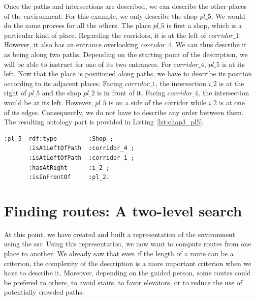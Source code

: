 Once the paths and intersections are described, we can describe the other places of the environment. For this example, we only describe the shop $pl\_5$. We would do the same process for all the others. The place $pl\_5$ is first a shop,  which is a particular kind of place. Regarding the corridors, it is at the left of $corridor\_1$. However, it also has an entrance overlooking $corridor\_4$. We can thus describe it as being along two paths. Depending on the starting point of the description, we will be able to instruct for one of its two entrances. For $corridor\_4$, $pl\_5$ is at its left. Now that the place is positioned along paths, we have to describe its position according to its adjacent places. Facing $corridor\_1$, the intersection $i\_2$ is at the right of $pl\_5$ and the shop $pl\_2$ is in front of it. Facing $corridor\_4$, the intersection would be at its left. However, $pl\_5$ is on a side of the corridor while $i\_2$ is at one of its edges. Consequently, we do not have to describe any order between them. The resulting ontology part is provided in Listing~\ref{lst:chap3_pl5}.

\begin{lstlisting}[frame=single, basicstyle=\scriptsize\ttfamily, label={lst:chap3_pl5}, caption={Description of the shop pl\_5 using the \acrshort{ssr} in the OWL language using the Turle syntax.},captionpos=b, style=OwlTurtle_indiv]
:pl_5  rdf:type         :Shop ;
       :isAtLeftOfPath  :corridor_4 ;
       :isAtLeftOfPath  :corridor_1 ;
       :hasAtRight      :i_2 ;
       :isInFrontOf     :pl_2.
\end{lstlisting}

\section{Finding routes: A two-level search}

At this point, we have created and built a representation of the environment using the \acrfull{ssr}. Using this representation, we now want to compute routes from one place to another. We already saw that even if the length of a route can be a criterion, the complexity of the description is a more important criterion when we have to describe it. Moreover, depending on the guided person, some routes could be prefered to others, to avoid stairs, to favor elevators, or to reduce the use of potentially crowded paths.

